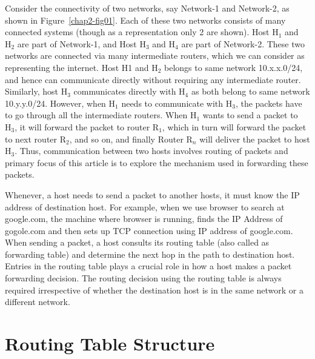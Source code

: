 \begin{multicols}{2}
Consider the connectivity of two networks, say Network-1 and Network-2, as shown in Figure~\ref{chap2-fig01}. Each of these two networks consists of many connected systems (though as a representation only 2 are shown). Host $\textrm{H}_1$ and $\textrm{H}_2$ are part of Network-1, and Host $\textrm{H}_3$ and $\textrm{H}_4$ are part of Network-2. These two networks are connected via many intermediate routers, which we can consider as representing the internet. Host H1 and $\textrm{H}_2$ belongs to same network 10.x.x.0/24, and hence can communicate directly without requiring any intermediate router. Similarly, host $\textrm{H}_3$ communicates directly with $\textrm{H}_4$ as both belong to same network 10.y.y.0/24. However, when $\textrm{H}_1$ needs to communicate with $\textrm{H}_3$, the packets have to go through all the intermediate routers. When $\textrm{H}_1$ wants to send a packet to $\textrm{H}_3$, it will forward the packet to router $\textrm{R}_1$, which in turn will forward the packet to next router $\textrm{R}_2$, and so on, and finally Router $\textrm{R}_n$ will deliver the packet to host $\textrm{H}_3$. Thus, communication between two hosts involves routing of packets and primary focus of this article is to explore the mechanism used in forwarding these packets.


Whenever, a host needs to send a packet to another hosts, it must know the IP address of destination host. For example, when we use browser to search at google.com, the machine where browser is running, finds the IP Address of gogole.com and then sets up TCP connection using IP address of google.com. When sending a packet, a host consults its routing table (also called as forwarding table) and determine the next hop in the path to destination host. Entries in the routing table plays a crucial role in how a host makes a packet forwarding decision. The routing decision using the routing table is always required irrespective of whether the destination host is in the same network or a different network.

\section{Routing Table Structure}\label{chap2-sec-1}


\end{multicols}
